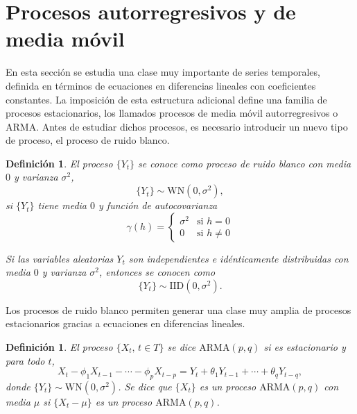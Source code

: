 \documentclass[12pt,twoside]{article}
\newtheorem{definition}[theorem]{Definición}
\newcommand{\arma}{\text{ARMA}}
\newcommand{\wn}{\text{WN}(0, \sigma^2)}
\begin{document}


\newpage
\section{Procesos autorregresivos y de media móvil}
En esta sección se estudia una clase muy importante de series temporales, definida en términos de ecuaciones en diferencias lineales con coeficientes constantes. La imposición de esta estructura adicional define una familia de procesos estacionarios, los llamados procesos de media móvil autorregresivos o ARMA. Antes de estudiar dichos procesos, es necesario introducir un nuevo tipo de proceso, el proceso de ruido blanco.


\begin{definition}\label{def:WN_process}
    El proceso $\{Y_t\}$ se conoce como proceso de ruido blanco con media $0$ y varianza $\sigma^2$,
    \begin{equation} \label{eq:WN_process}
        \{Y_t\} \sim \text{WN}(0, \sigma^2),
    \end{equation}
    si $\{Y_t\}$ tiene media $0$ y función de autocovarianza
    \begin{equation} \label{eq:WN_autocov}
        \gamma(h) = 
        \left\{ \begin{array}{ll} 
        \sigma^2 & \text{si } h=0 \\
        0 & \text{si } h \neq 0 
        \end{array} \right.
    \end{equation}

    Si las variables aleatorias $Y_t$ son independientes e idénticamente distribuidas con media $0$ y varianza $\sigma^2$, entonces se conocen como
    \begin{equation} \label{eq:IDD_process}
        \{Y_t\} \sim \text{IID}(0, \sigma^2).
    \end{equation}
\end{definition}

Los procesos de ruido blanco permiten generar una clase muy amplia de procesos estacionarios gracias a ecuaciones en diferencias lineales.

\begin{definition}\label{def:ARMA}
    El proceso $\{X_t, \,t\in T\}$ se dice $\arma(p,q)$ si es estacionario y para todo $t$, 
    \begin{equation}\label{eq:ARMA}
        X_t - \phi_1X_{t-1}-\dotsb-\phi_pX_{t-p} = Y_t +\theta_1Y_{t-1} + \dotsb + \theta_q Y_{t-q},
    \end{equation}
    donde $\{Y_t\}\sim \wn$. Se dice que $\{X_t\}$ es un proceso $\arma(p,q)$ con media $\mu$ si $\{X_t - \mu\}$ es un proceso $\arma(p,q)$.
\end{definition}
\end{document}
